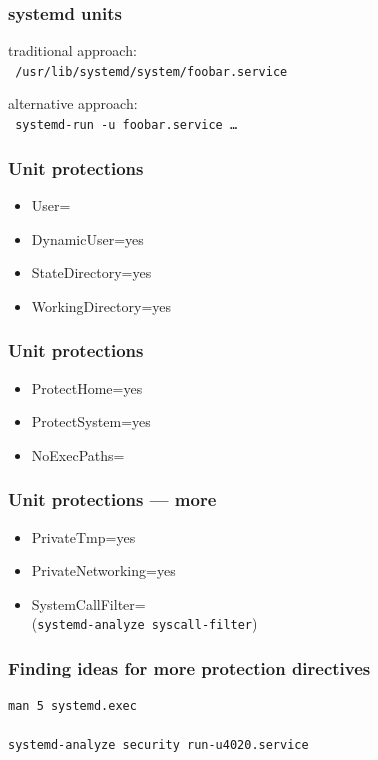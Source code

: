 \documentclass[]{beamer}
\begin{document}
\begin{frame}
  \frametitle{systemd units}

  traditional approach:\\ \texttt{\color{brown} /usr/lib/systemd/system/foobar.service}

  \quad

  alternative approach:\\ \texttt{\color{teal} systemd-run -u foobar.service …}
\end{frame}

\begin{frame}
  \frametitle{Unit protections}

  \begin{itemize}
  \item User=
  \item DynamicUser=yes

  \item StateDirectory=yes
  \item WorkingDirectory=yes

  \end{itemize}
\end{frame}

\begin{frame}
  \frametitle{Unit protections}

  \begin{itemize}
  \item ProtectHome=yes
  \item ProtectSystem=yes
  \item NoExecPaths=
  \end{itemize}
\end{frame}

\begin{frame}
  \frametitle{Unit protections — more}

  \begin{itemize}
  \item PrivateTmp=yes
  \item PrivateNetworking=yes
  \item SystemCallFilter=\\
        (\texttt{systemd-analyze syscall-filter})
    
  \end{itemize}
\end{frame}

\begin{frame}[fragile]
  \frametitle{Finding ideas for more protection directives}

  \begin{verbatim}
man 5 systemd.exec

systemd-analyze security run-u4020.service
  \end{verbatim}
\end{frame}
\end{document}
